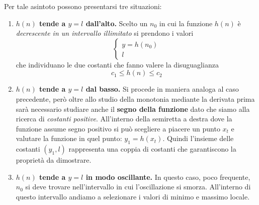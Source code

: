 Per tale asintoto possono presentarsi tre situazioni:
\begin{enumerate}
	\item \textbf{$h(n)$ tende a $y=l$ dall'alto.} Scelto un $n_{0}$ in cui la funzione $h(n)$ è \textit{decrescente in un intervallo illimitato} si prendono i valori
	\[
	\begin{cases}
		y=h(n_{0}) \\
		l
	\end{cases}
	\]
	che individuano le due costanti che fanno valere la disuguaglianza $$c_{1}\leq h(n) \leq c_{2}$$
	\item \textbf{$h(n)$ tende a $y=l$ dal basso.} Si procede in maniera analoga al caso precedente, però oltre allo studio della monotonia mediante la derivata prima sarà necessario studiare anche il \textbf{segno della funzione} dato che siamo alla ricerca di \textit{costanti positive}. All'interno della semiretta a destra dove la funzione assume segno positivo si può scegliere a piacere un punto $x_{t}$ e valutare la funzione in quel punto: $y_{1}=h(x_{t})$. Quindi l'insieme delle costanti $(y_{1},l)$ rappresenta una coppia di costanti che garantiscono la proprietà da dimostrare.
	\item \textbf{$h(n)$ tende a $y=l$ in modo oscillante.} In questo caso, poco frequente, $n_{0}$ si deve trovare nell'intervallo in cui l'oscillazione si smorza. All'interno di questo intervallo andiamo a selezionare i valori di minimo e massimo locale.
	
\end{enumerate}
